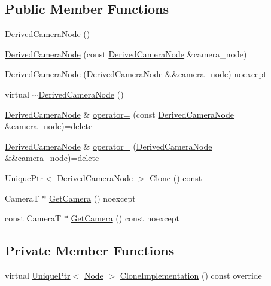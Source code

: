 \subsection*{Public Member Functions}
\begin{DoxyCompactItemize}
\item 
\hyperlink{classmage_1_1_derived_camera_node_aa000581c29ef654f09d94ddd392efa72}{Derived\+Camera\+Node} ()
\item 
\hyperlink{classmage_1_1_derived_camera_node_ae97b2a006e9e465e2530fdb814e855da}{Derived\+Camera\+Node} (const \hyperlink{classmage_1_1_derived_camera_node}{Derived\+Camera\+Node} \&camera\+\_\+node)
\item 
\hyperlink{classmage_1_1_derived_camera_node_a61ef46c03fc23258ef134fbb93cff742}{Derived\+Camera\+Node} (\hyperlink{classmage_1_1_derived_camera_node}{Derived\+Camera\+Node} \&\&camera\+\_\+node) noexcept
\item 
virtual \hyperlink{classmage_1_1_derived_camera_node_a74ab678b593c43b6bf95bb7fbfbd4d2d}{$\sim$\+Derived\+Camera\+Node} ()
\item 
\hyperlink{classmage_1_1_derived_camera_node}{Derived\+Camera\+Node} \& \hyperlink{classmage_1_1_derived_camera_node_a827c7952e061c6e12e38fff12585b3b3}{operator=} (const \hyperlink{classmage_1_1_derived_camera_node}{Derived\+Camera\+Node} \&camera\+\_\+node)=delete
\item 
\hyperlink{classmage_1_1_derived_camera_node}{Derived\+Camera\+Node} \& \hyperlink{classmage_1_1_derived_camera_node_a5faeff6f71a85b46d18f5b55e8dcf756}{operator=} (\hyperlink{classmage_1_1_derived_camera_node}{Derived\+Camera\+Node} \&\&camera\+\_\+node)=delete
\item 
\hyperlink{namespacemage_a3316d7143a973e37adf1110f2e80ca31}{Unique\+Ptr}$<$ \hyperlink{classmage_1_1_derived_camera_node}{Derived\+Camera\+Node} $>$ \hyperlink{classmage_1_1_derived_camera_node_a29e597fe2c9e0f37eeab8fec5330d764}{Clone} () const
\item 
CameraT $\ast$ \hyperlink{classmage_1_1_derived_camera_node_a423d9e416aec8ade92d0d2211d40de39}{Get\+Camera} () noexcept
\item 
const CameraT $\ast$ \hyperlink{classmage_1_1_derived_camera_node_aef2db8d343aeebc95c433150e234481a}{Get\+Camera} () const noexcept
\end{DoxyCompactItemize}
\subsection*{Private Member Functions}
\begin{DoxyCompactItemize}
\item 
virtual \hyperlink{namespacemage_a3316d7143a973e37adf1110f2e80ca31}{Unique\+Ptr}$<$ \hyperlink{classmage_1_1_node}{Node} $>$ \hyperlink{classmage_1_1_derived_camera_node_aa965751029ebd6b41d3805b499a8304e}{Clone\+Implementation} () const override
\end{DoxyCompactItemize}
